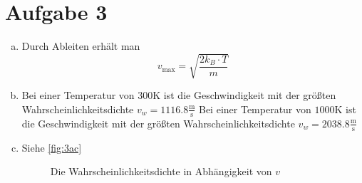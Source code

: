 \documentclass{article}
\begin{document}
    \section*{Aufgabe 3}
    \begin{enumerate}[(a)]
        \item Durch Ableiten erhält man $$v_{\text{max}} = \sqrt{\frac{2k_B \cdot T}{m}}$$
        \item Bei einer Temperatur von $300 \mathrm{K}$ ist die Geschwindigkeit mit der größten Wahrscheinlichkeitsdichte $v_w = 1116.8 \frac{\mathrm{m}}{\mathrm{s}}$
        Bei einer Temperatur von $1000 \mathrm{K}$ ist die Geschwindigkeit mit der größten Wahrscheinlichkeitsdichte $v_w = 2038.8 \frac{\mathrm{m}}{\mathrm{s}}$
        \item Siehe \autoref{fig:3ac}
        \begin{figure}[ht]
            \centering
            \caption{Die Wahrscheinlichkeitsdichte in Abhängigkeit von $v$}
            \label{fig:3ac}
        \end{figure}
    \end{enumerate}
\end{document}
